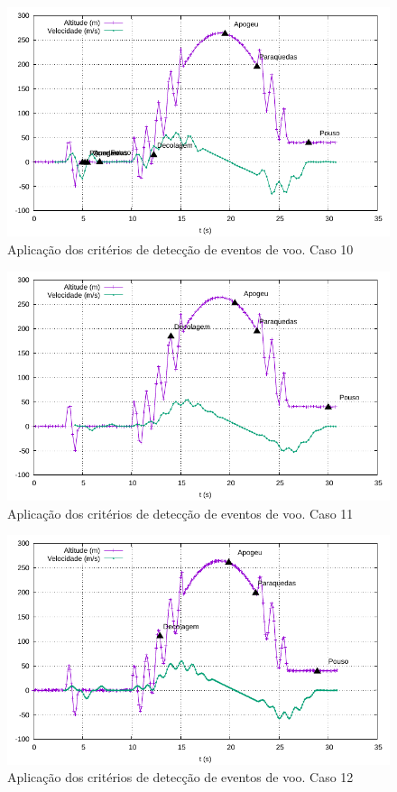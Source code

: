 \documentclass[12pt,a4paper]{article}
\begin{document}
\begin{figure}[!ht]
	\centering
	\includegraphics[width=\textwidth]{./data/cases/case10/trajectory}
	\caption{Aplicação dos critérios de detecção de eventos de voo. Caso 10}
	\label{fig:case10}
\end{figure}
\begin{figure}[!ht]
	\centering
	\includegraphics[width=\textwidth]{./data/cases/case11/trajectory}
	\caption{Aplicação dos critérios de detecção de eventos de voo. Caso 11}
	\label{fig:case11}
\end{figure}
\begin{figure}[!ht]
	\centering
	\includegraphics[width=\textwidth]{./data/cases/case12/trajectory}
	\caption{Aplicação dos critérios de detecção de eventos de voo. Caso 12}
	\label{fig:case12}
\end{figure}
\end{document}
